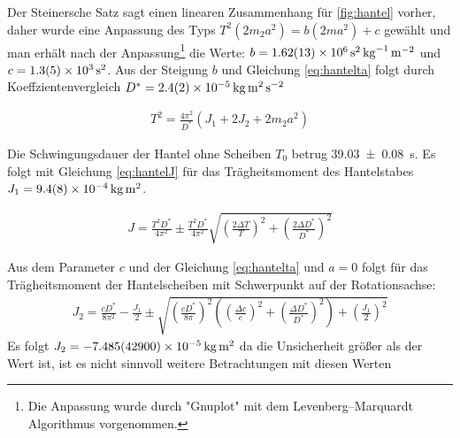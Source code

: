 Der Steinersche Satz sagt einen linearen Zusammenhang für \cref{fig:hantel} vorher, daher wurde eine Anpassung des Typs $T^2(2m_2 a^2)=b (2m a^2)+c$ gewählt und man erhält nach der Anpassung\footnote{Die Anpassung wurde durch "Gnuplot" mit dem Levenberg–Marquardt Algorithmus vorgenommen.  } die Werte: $ b               = \SI{1.62   \pm 0.13 e+006}{\second \squared \per \kilogram \per \metre \squared} $ und $c               = \SI{ 1.3      +-0.5e3 }   {\second \squared}$. Aus der Steigung $b$ und Gleichung \ref{eq:hantelta} folgt durch Koeffzientenvergleich $D^*=\SI{2.4+-0.2e-5}{\kilogram \metre \squared \per \second \squared }$







\begin{align}
	T^2= \frac{4 \pi^2}{D^*}(J_1+2J_2+2m_2 a^2)
	\label{eq:hantelta}
\end{align}



Die Schwingungsdauer der Hantel ohne Scheiben $T_0$  betrug \SI{39,03 \pm 0.08}{s}. Es folgt mit Gleichung \ref{eq:hantelJ} für das Trägheitsmoment des Hantelstabes $J_1 = \SI{9.4 \pm 0.8 e-4}{\kilogram \metre \squared}$.



\begin{align}
	J=\frac{T^2 D^*}{4 \pi^2} \pm \frac{T^2 D^*}{4 \pi^2} \sqrt{
	\left(\frac{2 \Delta T}{T} \right)^2 + 	\left(\frac{2 \Delta D^*}{D^*} \right)^2 }
\label{eq:hantelJ}
\end{align}








Aus dem Parameter $c$ und der Gleichung \ref{eq:hantelta} und $a=0$  folgt für das Trägheitsmoment der Hantelscheiben mit Schwerpunkt auf der Rotationsachse:
\begin{align}
J_2=\frac{c D^*}{8 \pi ^2}-\frac{J_1}{2} \pm \sqrt{\left( \frac{c D^*}{8 \pi}\right) ^2\left( \left( \frac{\Delta c}{c}\right) ^2+  \left( \frac{\Delta D^*}{D^*}\right) ^2\right) + \left(\frac{J_1}{2}\right)^2 }
\end{align}
Es folgt $J_2=\SI{-7.485 \pm 42.9 e-5 }{\kilogram \metre \squared}$ da die Unsicherheit größer als der Wert ist, ist es nicht sinnvoll weitere Betrachtungen mit diesen Werten 




















